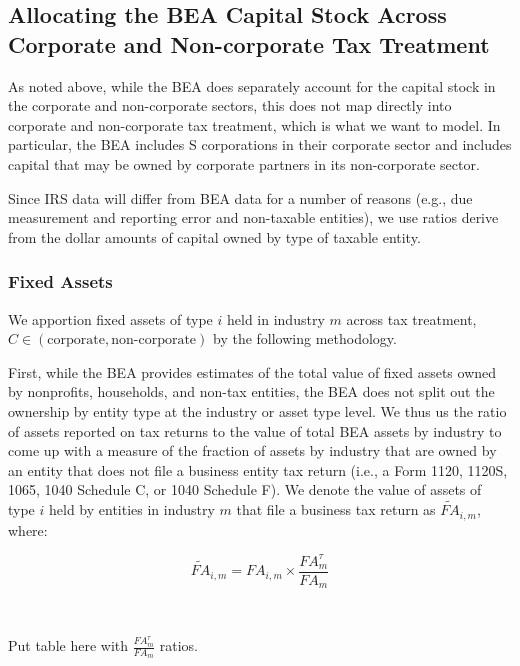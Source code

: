 \documentclass[article,11pt,letterpaper,fleqn]{article}
\theoremstyle{definition}
\numberwithin{equation}{section}
\begin{document}
\subsection{Allocating the BEA Capital Stock Across Corporate and Non-corporate Tax Treatment} 

As noted above, while the BEA does separately account for the capital stock in the corporate and non-corporate sectors, this does not map directly into corporate and non-corporate tax treatment, which is what we want to model.  In particular, the BEA includes S corporations in their corporate sector and includes capital that may be owned by corporate partners in its non-corporate sector.  

Since IRS data will differ from BEA data for a number of reasons (e.g., due measurement and reporting error and non-taxable entities), we use ratios derive from the dollar amounts of capital owned by type of taxable entity. 

\subsubsection{Fixed Assets}
We apportion fixed assets of type $i$ held in industry $m$ across tax treatment, $C\in(\text{corporate},\text{non-corporate})$ by the following methodology.

First, while the BEA provides estimates of the total value of fixed assets owned by nonprofits, households, and non-tax entities, the BEA does not split out the ownership by entity type at the industry or asset type level.  We thus us the ratio of assets reported on tax returns to the value of total BEA assets by industry to come up with a measure of the fraction of assets by industry that are owned by an entity that does not file a business entity tax return (i.e., a Form 1120, 1120S, 1065, 1040 Schedule C, or 1040 Schedule F).  We denote the value of assets of type $i$ held by entities in industry $m$ that file a business tax return as $\widetilde{FA}_{i,m}$, where:

\begin{equation}
\widetilde{FA}_{i,m}={FA}_{i,m}\times \frac{{FA}^{\tau}_{m}}{{FA}_{m}}
\end{equation}

\ \\
\begin{center}
Put table here with $\frac{{FA}^{\tau}_{m}}{{FA}_{m}}$ ratios.
\end{center}
\ \\
\end{document}
